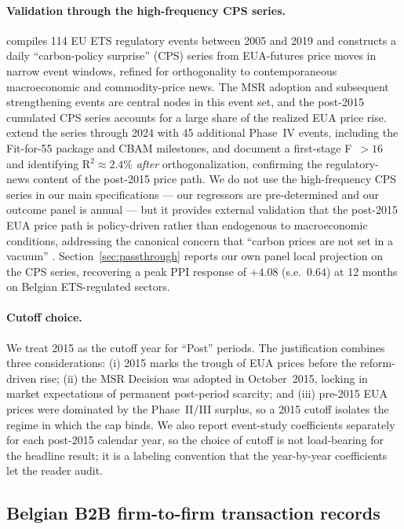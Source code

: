 \paragraph{Validation through the high-frequency CPS series.} \citet{kanzig2023unequal} compiles 114 EU ETS regulatory events between 2005 and 2019 and constructs a daily ``carbon-policy surprise'' (CPS) series from EUA-futures price moves in narrow event windows, refined for orthogonality to contemporaneous macroeconomic and commodity-price news. The MSR adoption and subsequent strengthening events are central nodes in this event set, and the post-2015 cumulated CPS series accounts for a large share of the realized EUA price rise. \citet{BauerKaenzigRudebusch2026} extend the series through 2024 with 45 additional Phase~IV events, including the Fit-for-55 package and CBAM milestones, and document a first-stage F~$> 16$ and identifying R$^2 \approx 2.4\%$ \emph{after} orthogonalization, confirming the regulatory-news content of the post-2015 price path. We do not use the high-frequency CPS series in our main specifications --- our regressors are pre-determined and our outcome panel is annual --- but it provides external validation that the post-2015 EUA price path is policy-driven rather than endogenous to macroeconomic conditions, addressing the canonical concern that ``carbon prices are not set in a vacuum'' \citep{kanzig2023unequal}. Section~\ref{sec:passthrough} reports our own panel local projection on the \citet{kanzig2023unequal} CPS series, recovering a peak PPI response of $+4.08$ (s.e.\ $0.64$) at 12 months on Belgian ETS-regulated sectors.

\paragraph{Cutoff choice.} We treat 2015 as the cutoff year for ``Post'' periods. The justification combines three considerations: (i) 2015 marks the trough of EUA prices before the reform-driven rise; (ii) the MSR Decision was adopted in October~2015, locking in market expectations of permanent post-period scarcity; and (iii) pre-2015 EUA prices were dominated by the Phase~II/III surplus, so a 2015 cutoff isolates the regime in which the cap binds. We also report event-study coefficients separately for each post-2015 calendar year, so the choice of cutoff is not load-bearing for the headline result; it is a labeling convention that the year-by-year coefficients let the reader audit.

\subsection{Belgian B2B firm-to-firm transaction records}

